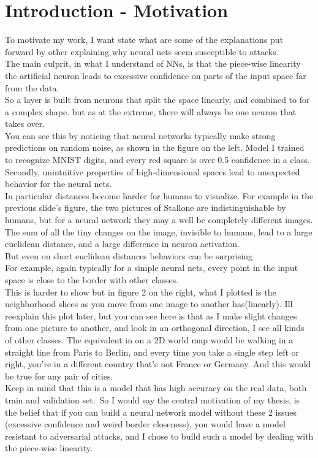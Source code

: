 \documentclass{article}
\begin{document}
\section{Introduction - Motivation}
To motivate my work, I want state what are some of the explanations put forward by other explaining why neural nets seem susceptible to attacks.\\
The main culprit, in what I understand of NNs, is that the piece-wise linearity the artificial neuron leads to excessive confidence on parts of the input space far from the data.\\
So a layer is built from neurons that split the space linearly, and combined to for a complex shape. but as at the extreme, there will always be one neuron that takes over.\\
You can see this by noticing that neural networks typically make strong predictions on random noise, as shown in the figure on the left. Model I trained to recognize MNIST digits, and every red square is over 0.5 confidence in a class.\\

Secondly, unintuitive properties of high-dimensional spaces lead to unexpected behavior for the neural nets.\\
In particular distances become harder for humans to visualize. For example in the previous slide's figure, the two pictures of Stallone are indistinguishable by humans, but for a neural network they may a well be completely different images. The sum of all the tiny changes on the image, invisible to humans, lead to a large euclidean distance, and a large difference in neuron activation.\\
But even on short euclidean distances behaviors can be surprising\\
For example, again typically for a simple neural nets, every point in the input space is close to the border with other classes.\\
This is harder to show but in figure 2 on the right, what I plotted is the neighborhood slices as you move from one image to another has(linearly). Ill reexplain this plot later, but you can see here is that as I make slight changes from one picture to another, and look in an orthogonal direction, I see all kinds of other classes. The equivalent in on a 2D world map would be walking in a straight line from Paris to Berlin, and every time you take a single step left or right, you're in a different country that's not France or Germany. And this would be true for any pair of cities.\\
Keep in mind that this is a model that has high accuracy on the real data, both train and validation set.\
So I would say the central motivation of my thesis, is the belief that if you can build a neural network model without these 2 issues (excessive confidence and weird border closeness), you would have a model resistant to adversarial attacks, and I chose to build such a model by dealing with the piece-wise linearity.
\end{document}
